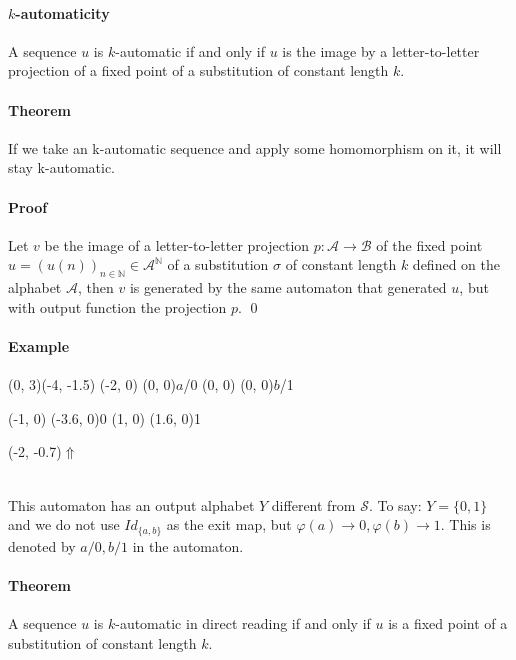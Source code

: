\documentclass{article}
\begin{document}
\paragraph{$k$-automaticity} A sequence $u$ is $k$-automatic if and only if 
$u$ is the image by a letter-to-letter projection of a fixed point of a 
substitution of constant length $k$.

\paragraph{Theorem} If we take an k-automatic sequence and apply some 
homomorphism on it, it will stay k-automatic.

\paragraph{Proof} Let $v$ be the image of a letter-to-letter 
projection $p: \mathcal{A} \rightarrow \mathcal{B}$ of the fixed point 
$u = (u(n))_{n \in \mathbb{N}} \in \mathcal{A}^\mathbb{N}$ of a substitution
$\sigma$ of constant length $k$ defined on the alphabet $\mathcal{A}$, then 
$v$ is generated by the same automaton that generated $u$, but with output 
function the projection $p$. \qed

\paragraph{Example\\}
\begin{graph}(0, 3)(-4, -1.5)
  (-2, 0) (0, 0){$a$/0}
  (0, 0)  (0, 0){$b$/1}

  (-1, 0) \freetext(-3.6, 0){0}
   
   
  (1, 0) \freetext(1.6, 0){1}

  \freetext(-2, -0.7){$\Uparrow$}
\end{graph}\\
This automaton has an output alphabet $Y$ different from $\mathcal{S}$. To
say: $Y = \{0, 1\}$ and we do not use $Id_{\{a, b\}}$ as the exit map, but
$\varphi(a) \rightarrow 0, \varphi(b) \rightarrow 1$. This is denoted by 
$a/0, b/1$ in the automaton.

\paragraph{Theorem} A sequence $u$ is $k$-automatic in direct reading if and 
only if $u$ is a fixed point of a substitution of constant length $k$.
\end{document}
